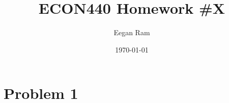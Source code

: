 \documentclass{scrartcl}
\title{ECON440 Homework \#X}
\author{Eegan Ram}
\date{\today}
\begin{document}
\maketitle

\section{Problem 1}
\end{document}
